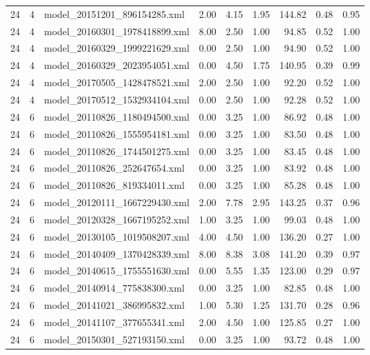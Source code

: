 \begin{table}[ht]
\begin{tabular}{rrlrrrrrr}
   24 &   4 & model\_20151201\_896154285.xml & 2.00 & 4.15 & 1.95 & 144.82 & 0.48 & 0.95 \\ 
   24 &   4 & model\_20160301\_1978418899.xml & 8.00 & 2.50 & 1.00 & 94.85 & 0.52 & 1.00 \\ 
   24 &   4 & model\_20160329\_1999221629.xml & 0.00 & 2.50 & 1.00 & 94.90 & 0.52 & 1.00 \\ 
   24 &   4 & model\_20160329\_2023954051.xml & 0.00 & 4.50 & 1.75 & 140.95 & 0.39 & 0.99 \\ 
   24 &   4 & model\_20170505\_1428478521.xml & 2.00 & 2.50 & 1.00 & 92.20 & 0.52 & 1.00 \\ 
   24 &   4 & model\_20170512\_1532934104.xml & 0.00 & 2.50 & 1.00 & 92.28 & 0.52 & 1.00 \\ 
   24 &   6 & model\_20110826\_1180494500.xml & 0.00 & 3.25 & 1.00 & 86.92 & 0.48 & 1.00 \\ 
   24 &   6 & model\_20110826\_1555954181.xml & 0.00 & 3.25 & 1.00 & 83.50 & 0.48 & 1.00 \\ 
   24 &   6 & model\_20110826\_1744501275.xml & 0.00 & 3.25 & 1.00 & 83.45 & 0.48 & 1.00 \\ 
   24 &   6 & model\_20110826\_252647654.xml & 0.00 & 3.25 & 1.00 & 83.92 & 0.48 & 1.00 \\ 
   24 &   6 & model\_20110826\_819334011.xml & 0.00 & 3.25 & 1.00 & 85.28 & 0.48 & 1.00 \\ 
   24 &   6 & model\_20120111\_1667229430.xml & 2.00 & 7.78 & 2.95 & 143.25 & 0.37 & 0.96 \\ 
   24 &   6 & model\_20120328\_1667195252.xml & 1.00 & 3.25 & 1.00 & 99.03 & 0.48 & 1.00 \\ 
   24 &   6 & model\_20130105\_1019508207.xml & 4.00 & 4.50 & 1.00 & 136.20 & 0.27 & 1.00 \\ 
   24 &   6 & model\_20140409\_1370428339.xml & 8.00 & 8.38 & 3.08 & 141.20 & 0.39 & 0.97 \\ 
   24 &   6 & model\_20140615\_1755551630.xml & 0.00 & 5.55 & 1.35 & 123.00 & 0.29 & 0.97 \\ 
   24 &   6 & model\_20140914\_775838300.xml & 0.00 & 3.25 & 1.00 & 82.85 & 0.48 & 1.00 \\ 
   24 &   6 & model\_20141021\_386995832.xml & 1.00 & 5.30 & 1.25 & 131.70 & 0.28 & 0.96 \\ 
   24 &   6 & model\_20141107\_377655341.xml & 2.00 & 4.50 & 1.00 & 125.85 & 0.27 & 1.00 \\ 
   24 &   6 & model\_20150301\_527193150.xml & 0.00 & 3.25 & 1.00 & 93.72 & 0.48 & 1.00 \\ 

\end{tabular}
\end{table}
